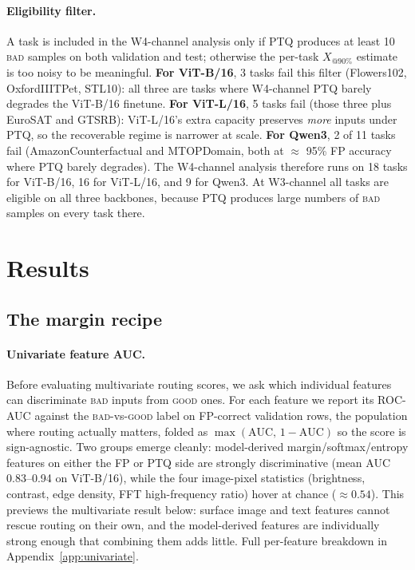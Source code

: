 \documentclass{article}
\makeatletter
\newcommand{\fp}{\textsc{FP}\xspace}
\newcommand{\ptq}{\textsc{PTQ}\xspace}
\newcommand{\good}{\textsc{good}\xspace}
\newcommand{\bad}{\textsc{bad}\xspace}
\newcommand{\xat}[1]{\ensuremath{X_{@#1\%}}}
\makeatother
\begin{document}
\paragraph{Eligibility filter.}
A task is included in the W4-channel analysis only if \ptq{} produces at least 10 \bad{} samples on both validation and test; otherwise the per-task \xat{90} estimate is too noisy to be meaningful.
\textbf{For ViT-B/16}, 3 tasks fail this filter (Flowers102, OxfordIIITPet, STL10): all three are tasks where W4-channel \ptq{} barely degrades the ViT-B/16 finetune.
\textbf{For ViT-L/16}, 5 tasks fail (those three plus EuroSAT and GTSRB): ViT-L/16's extra capacity preserves \emph{more} inputs under PTQ, so the recoverable regime is narrower at scale.
\textbf{For Qwen3}, 2 of 11 tasks fail (AmazonCounterfactual and MTOPDomain, both at $\approx$ 95\% FP accuracy where PTQ barely degrades).
The W4-channel analysis therefore runs on 18 tasks for ViT-B/16, 16 for ViT-L/16, and 9 for Qwen3.
At W3-channel all tasks are eligible on all three backbones, because PTQ produces large numbers of \bad{} samples on every task there.

\section{Results}\label{sec:results}

\subsection{The margin recipe}\label{sec:headline}

\paragraph{Univariate feature AUC.}
Before evaluating multivariate routing scores, we ask which individual features can discriminate \bad{} inputs from \good{} ones. For each feature we report its ROC-AUC against the \bad{}-vs-\good{} label on FP-correct validation rows, the population where routing actually matters, folded as $\max(\mathrm{AUC},\,1-\mathrm{AUC})$ so the score is sign-agnostic. Two groups emerge cleanly: model-derived margin/softmax/entropy features on either the \fp{} or \ptq{} side are strongly discriminative (mean AUC 0.83--0.94 on ViT-B/16), while the four image-pixel statistics (brightness, contrast, edge density, FFT high-frequency ratio) hover at chance ($\approx 0.54$). This previews the multivariate result below: surface image and text features cannot rescue routing on their own, and the model-derived features are individually strong enough that combining them adds little. Full per-feature breakdown in Appendix~\ref{app:univariate}.
\end{document}

